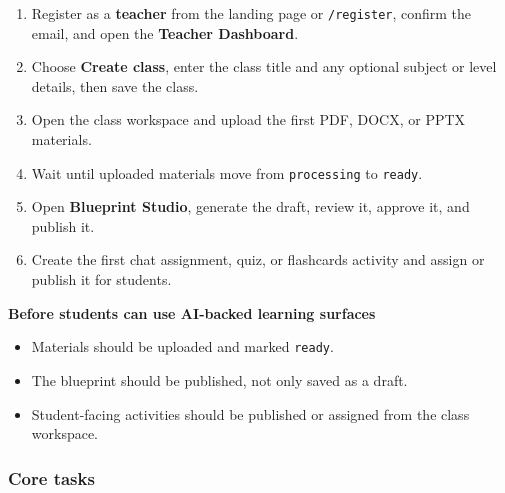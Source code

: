 \documentclass[11pt,a4paper]{article}
\begin{document}
\begin{enumerate}
  \item Register as a \textbf{teacher} from the landing page or \texttt{/register}, confirm the email,
  and open the \textbf{Teacher Dashboard}.
  \item Choose \textbf{Create class}, enter the class title and any optional subject or level details,
  then save the class.
  \item Open the class workspace and upload the first PDF, DOCX, or PPTX materials.
  \item Wait until uploaded materials move from \texttt{processing} to \texttt{ready}.
  \item Open \textbf{Blueprint Studio}, generate the draft, review it, approve it, and publish it.
  \item Create the first chat assignment, quiz, or flashcards activity and assign or publish it for
  students.
\end{enumerate}

\textbf{Before students can use AI-backed learning surfaces}
\begin{itemize}
  \item Materials should be uploaded and marked \texttt{ready}.
  \item The blueprint should be published, not only saved as a draft.
  \item Student-facing activities should be published or assigned from the class workspace.
\end{itemize}

\subsubsection*{Core tasks}
\end{document}
